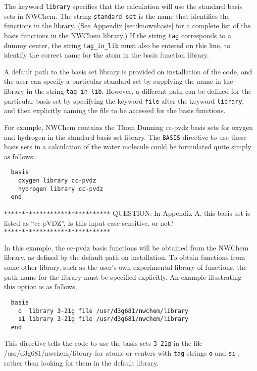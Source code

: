 The keyword \verb+library+ specifies that the calculation will use the 
standard basis sets in NWChem.  The string \verb+standard_set+ is the
name that identifies the functions in the library.  (See Appendix 
\ref{sec:knownbasis} for a complete list of the basis functions in the
NWChem library.)  If the string \verb+tag+ corresponds to
a dummy center, the string \verb+tag_in_lib+ must also be entered on
this line, to identify
the correct name for the atom in the basis function library.

A default path to the basis set library
is provided on installation of the code, and the user can specify a 
particular standard set by supplying the name in the library
in the string \verb+tag_in_lib+.  However, a different path can be defined
for the particular basis set by specifying the keyword \verb+file+ after
the keyword \verb+library+, and then explicitly naming the file to be
accessed for the basis functions.

For example, NWChem contains the Thom Dunning cc-pvdz basis sets for
oxygen and hydrogen in the standard basis set library.  The \verb+BASIS+
directive to use these basis sets in a calculation of the water molecule
could be formulated quite simply as follows;

\begin{verbatim}
  basis
    oxygen library cc-pvdz
    hydrogen library cc-pvdz
  end
\end{verbatim}

\verb+******************************+
QUESTION: In Appendix A, this basis set is listed as ``cc-pVDZ''.  Is
this input case-sensitive, or not?
\verb+******************************+

In this example, the cc-pvdz basis functions will be obtained from the
NWChem library, as defined by the default path on installation.  To obtain
functions from some other library, such as the user's own experimental
library of functions, the path name for the library must be specified
explicitly.  An example illustrating this option is as follows,

\begin{verbatim}
  basis
    o  library 3-21g file /usr/d3g681/nwchem/library
    si library 3-21g file /usr/d3g681/nwchem/library
  end
\end{verbatim}

This directive tells the code to use the basis sets \verb+3-21g+ in the
file /usr/d3g681/nwchem/library for atoms  or centers with \verb+tag+ 
strings \verb+o+ and \verb+si+ , rather than looking for them in the
default library.

